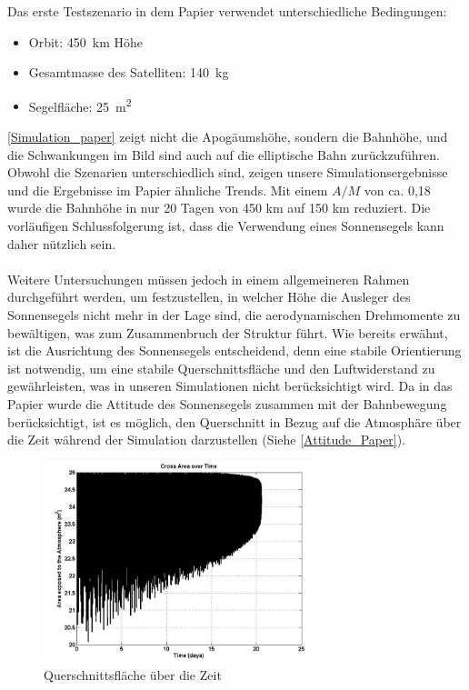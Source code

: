 \documentclass{article}
\begin{document}
Das erste Testszenario in dem Papier verwendet unterschiedliche Bedingungen: 
\begin{itemize}
	\item Orbit: \SI{450}{\kilo\meter} Höhe
	\item Gesamtmasse des Satelliten: \SI{140}{\kilogram}
	\item Segelfläche: \SI{25}{\square \meter}
\end{itemize}
\autoref{Simulation_paper} zeigt nicht die Apogäumshöhe, sondern die Bahnhöhe, und die Schwankungen im Bild sind auch auf die elliptische Bahn zurückzuführen. Obwohl die Szenarien unterschiedlich sind, zeigen unsere Simulationsergebnisse und die Ergebnisse im Papier ähnliche Trends. Mit einem $A/M$ von ca. 0,18 wurde die Bahnhöhe in nur 20 Tagen von 450 km auf 150 km reduziert. Die vorläufigen Schlussfolgerung ist, dass die Verwendung eines Sonnensegels kann daher nützlich sein. 
\\\\
Weitere Untersuchungen müssen jedoch in einem allgemeineren Rahmen durchgeführt werden, um festzustellen, in welcher Höhe die Ausleger des Sonnensegels nicht mehr in der Lage sind, die aerodynamischen Drehmomente zu bewältigen, was zum Zusammenbruch der Struktur führt. Wie bereits erwähnt, ist die Ausrichtung des Sonnensegels entscheidend, denn eine stabile Orientierung ist notwendig, um eine stabile Querschnittsfläche und den Luftwiderstand zu gewährleisten, was in unseren Simulationen nicht berücksichtigt wird. Da in das Papier wurde die Attitude des Sonnensegels zusammen mit der Bahnbewegung berücksichtigt, ist es möglich, den Querschnitt in Bezug auf die Atmosphäre über die Zeit während der Simulation darzustellen (Siehe \autoref{Attitude_Paper}).
\begin{figure}[htbp]
	\centering
	\includegraphics[width=0.7\textwidth]{bilder/Attitude_Paper.png}
	\caption{Querschnittsfläche über die Zeit}
	\label{Attitude_Paper}
\end{figure}
\end{document}
